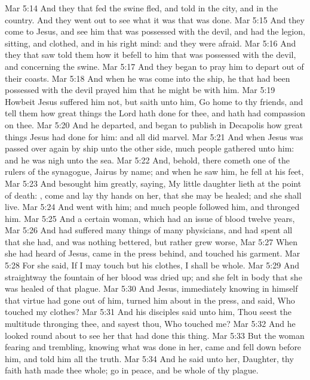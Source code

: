 \vs Mar 5:14 And they that fed the swine fled, and told  in the city, and in the country. And they went out to see what it was that was done.
\vs Mar 5:15 And they come to Jesus, and see him that was possessed with the devil, and had the legion, sitting, and clothed, and in his right mind: and they were afraid.
\vs Mar 5:16 And they that saw  told them how it befell to him that was possessed with the devil, and  concerning the swine.
\vs Mar 5:17 And they began to pray him to depart out of their coasts.
\vs Mar 5:18 And when he was come into the ship, he that had been possessed with the devil prayed him that he might be with him.
\vs Mar 5:19 Howbeit Jesus suffered him not, but saith unto him, Go home to thy friends, and tell them how great things the Lord hath done for thee, and hath had compassion on thee.
\vs Mar 5:20 And he departed, and began to publish in Decapolis how great things Jesus had done for him: and all  did marvel.
\vs Mar 5:21 And when Jesus was passed over again by ship unto the other side, much people gathered unto him: and he was nigh unto the sea.
\vs Mar 5:22 And, behold, there cometh one of the rulers of the synagogue, Jairus by name; and when he saw him, he fell at his feet,
\vs Mar 5:23 And besought him greatly, saying, My little daughter lieth at the point of death: , come and lay thy hands on her, that she may be healed; and she shall live.
\vs Mar 5:24 And  went with him; and much people followed him, and thronged him.
\vs Mar 5:25 And a certain woman, which had an issue of blood twelve years,
\vs Mar 5:26 And had suffered many things of many physicians, and had spent all that she had, and was nothing bettered, but rather grew worse,
\vs Mar 5:27 When she had heard of Jesus, came in the press behind, and touched his garment.
\vs Mar 5:28 For she said, If I may touch but his clothes, I shall be whole.
\vs Mar 5:29 And straightway the fountain of her blood was dried up; and she felt in  body that she was healed of that plague.
\vs Mar 5:30 And Jesus, immediately knowing in himself that virtue had gone out of him, turned him about in the press, and said, Who touched my clothes?
\vs Mar 5:31 And his disciples said unto him, Thou seest the multitude thronging thee, and sayest thou, Who touched me?
\vs Mar 5:32 And he looked round about to see her that had done this thing.
\vs Mar 5:33 But the woman fearing and trembling, knowing what was done in her, came and fell down before him, and told him all the truth.
\vs Mar 5:34 And he said unto her, Daughter, thy faith hath made thee whole; go in peace, and be whole of thy plague.
